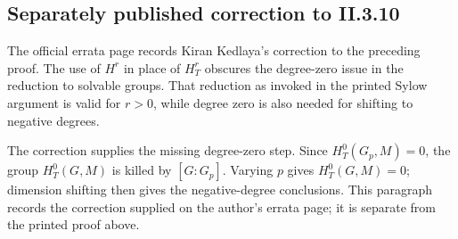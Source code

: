\documentclass[11pt]{article}
\newcommand{\HT}[2]{H_T^{#1}(#2)}
\begin{document}
\subsection*{Separately published correction to II.3.10}
The official errata page records Kiran Kedlaya's correction to the preceding
proof. The use of $H^r$ in place of $H_T^r$ obscures the degree-zero issue in
the reduction to solvable groups. That reduction as invoked in the printed
Sylow argument is valid for $r>0$, while degree zero is also needed for
shifting to negative degrees.

The correction supplies the missing degree-zero step.
Since $\HT{0}{G_p,M}=0$, the group $\HT{0}{G,M}$ is killed by $[G:G_p]$.
Varying $p$ gives $\HT{0}{G,M}=0$; dimension shifting then gives the
negative-degree conclusions. This paragraph records the correction supplied
on the author's errata page; it is separate from the printed proof above.

\end{document}
